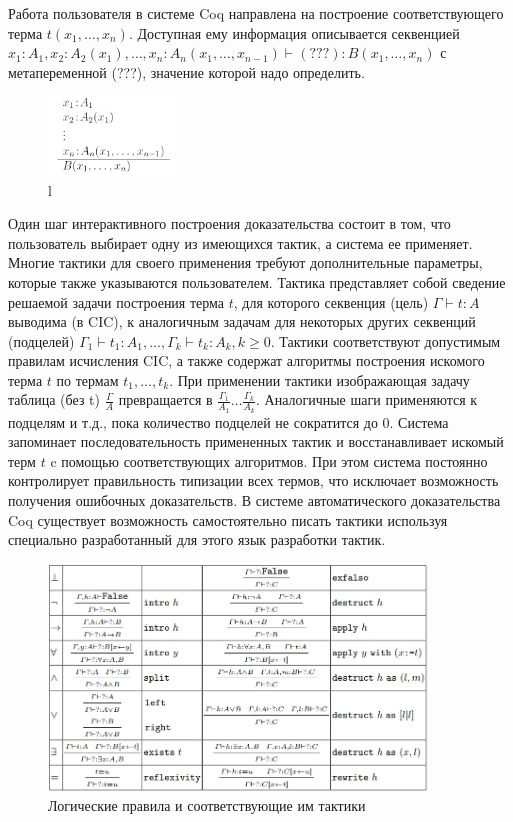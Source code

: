 Работа пользователя в системе Coq направлена на построение соответствующего 
терма $t(x_{1}, \ldots , x_{n})$. Доступная ему информация описывается 
секвенцией $x_{1}:A_{1}, x_{2}:A_{2}(x_{1}), \ldots , x_{n}:A_{n}(x_{1},\ldots
 , x_{n−1}) \vdash (???) :B(x_{1}, \ldots , x_{n})$ с метапеременной (???), 
значение которой надо определить.

\begin{figure}[h,t]
	\centering
		\includegraphics[width=0.30\textwidth]{img/dsdjl.png}
	\caption{l}
	\label{fig:dsdjl}
\end{figure}


Один шаг интерактивного построения доказательства состоит в том, что 
пользователь выбирает одну из имеющихся тактик, а система ее применяет. 
Многие тактики для своего применения требуют дополнительные параметры, 
которые также указываются пользователем. Тактика представляет собой сведение 
решаемой задачи построения терма $t$, для которого секвенция (цель) $\Gamma 
\vdash t : A$ выводима (в CIC), к аналогичным задачам для некоторых других 
секвенций (подцелей) $\Gamma_{1} \vdash t_{1} : A_{1}, \ldots ,\Gamma_{k} 
\vdash t_{k} : A_{k}, k \geq 0$. Тактики соответствуют допустимым правилам 
исчисления CIC, а также содержат алгоритмы построения искомого терма $t$ по 
термам $t_{1}, \ldots, t_{k}$. При применении тактики изображающая задачу 
таблица (без t) $\frac{\Gamma}{A}$ превращается в $\frac{\Gamma_{1}}{A_{1}}  
\ldots \frac{\Gamma_{k}}{A_{k}}$.
Аналогичные шаги применяются к подцелям и т.д., пока количество
подцелей не сократится до 0. Система запоминает последовательность
примененных тактик и восстанавливает искомый терм $t$ c помощью 
соответствующих алгоритмов. При этом система постоянно контролирует 
правильность типизации всех термов, что исключает возможность получения 
ошибочных доказательств\cite{msu}. В системе автоматического доказательства 
Coq существует возможность самостоятельно писать тактики используя специально 
разработанный для этого язык разработки тактик.

\begin{figure}[ht]
	\centering
		\includegraphics[width=0.90\textwidth]{img/тактики.jpg}
	\caption{Логические правила и соответствующие им тактики}
	\label{fig:тактики}
\end{figure}

